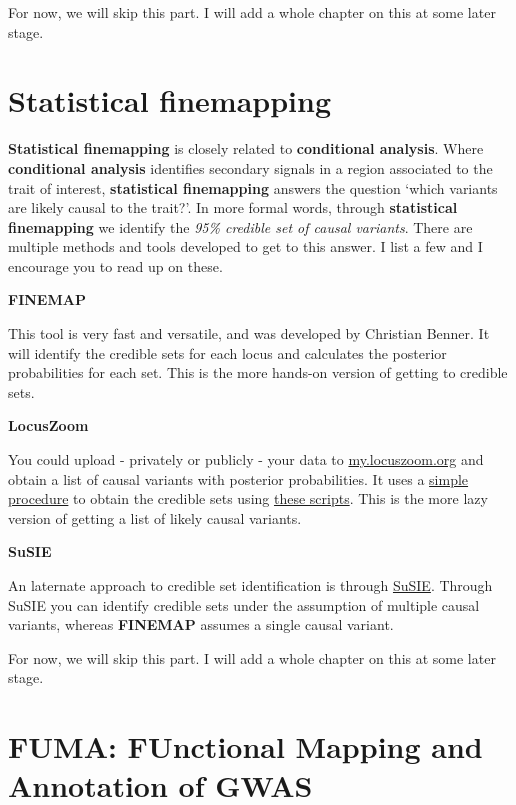 \documentclass[
]{book}
\begin{document}
For now, we will skip this part. I will add a whole chapter on this at some later stage.

\hypertarget{statistical-finemapping}{%
\section{Statistical finemapping}\label{statistical-finemapping}}

\textbf{Statistical finemapping} is closely related to \textbf{conditional analysis}. Where \textbf{conditional analysis} identifies secondary signals in a region associated to the trait of interest, \textbf{statistical finemapping} answers the question `which variants are likely causal to the trait?'. In more formal words, through \textbf{statistical finemapping} we identify the \emph{95\% credible set of causal variants}.
There are multiple methods and tools developed to get to this answer. I list a few and I encourage you to read up on these.

\textbf{FINEMAP}

This tool is very fast and versatile, and was developed by Christian Benner. It will identify the credible sets for each locus and calculates the posterior probabilities for each set. This is the more hands-on version of getting to credible sets.

\textbf{LocusZoom}

You could upload - privately or publicly - your data to \href{https://my.locuszoom.org}{my.locuszoom.org} and obtain a list of causal variants with posterior probabilities. It uses a \href{https://statgen.github.io/gwas-credible-sets/method/locuszoom-credible-sets.pdf}{simple procedure} to obtain the credible sets using \href{https://github.com/statgen/gwas-credible-sets/}{these scripts}. This is the more lazy version of getting a list of likely causal variants.

\textbf{SuSIE}

An laternate approach to credible set identification is through \href{https://stephenslab.github.io/susieR/index.html}{SuSIE}. Through SuSIE you can identify credible sets under the assumption of multiple causal variants, whereas \textbf{FINEMAP} assumes a single causal variant.

For now, we will skip this part. I will add a whole chapter on this at some later stage.

\hypertarget{fuma-functional-mapping-and-annotation-of-gwas}{%
\section{FUMA: FUnctional Mapping and Annotation of GWAS}\label{fuma-functional-mapping-and-annotation-of-gwas}}
\end{document}
